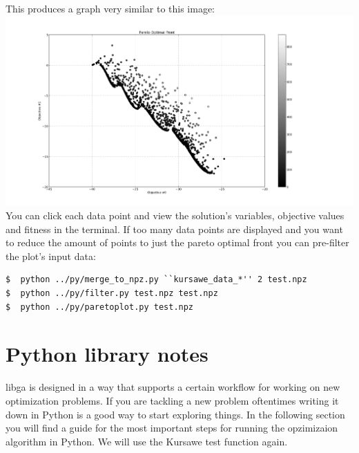 \documentclass[12pt]{article}
\begin{document}
This produces a graph very similar to this image: \\
\includegraphics[scale=.4]{example.png} \\
You can click each data point and view the solution's variables, objective values and fitness in the terminal. If too many data points are displayed and you want to reduce the amount of points to just the pareto optimal front you can pre-filter the plot's input data: 
\begin{lstlisting}[style=Bash]
$  python ../py/merge_to_npz.py ``kursawe_data_*'' 2 test.npz
$  python ../py/filter.py test.npz test.npz
$  python ../py/paretoplot.py test.npz
\end{lstlisting}

\section{Python library notes}
libga is designed in a way that supports a certain workflow for working on new optimization problems. If you are tackling a new problem oftentimes writing it down in Python is a good way to start exploring things. In the following section you will find a guide for the most important steps for running the opzimizaion algorithm in Python. We will use the Kursawe test function again. 
\end{document}
